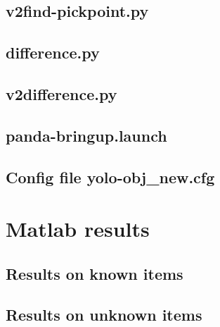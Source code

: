 \section{v2find-pickpoint.py}\label{sec:v2findpickpoint}

\pagebreak

\section{difference.py}\label{sec:difference}

\pagebreak

\section{v2difference.py}\label{sec:v2difference}

\pagebreak

\section{panda-bringup.launch}\label{sec:pandabringup}

\pagebreak
\section{Config file yolo-obj\_new.cfg}\label{sec:config}

\pagebreak

\chapter{Matlab results}
\section{Results on known items}\label{sec:apIoUresults}
\begin{figure}[h]
 \centering 
 
\end{figure}

\clearpage
\section{Results on unknown items}\label{sec:apIoUunknownresults}
\begin{figure}[h]
 \centering 
 
\end{figure}

\clearpage